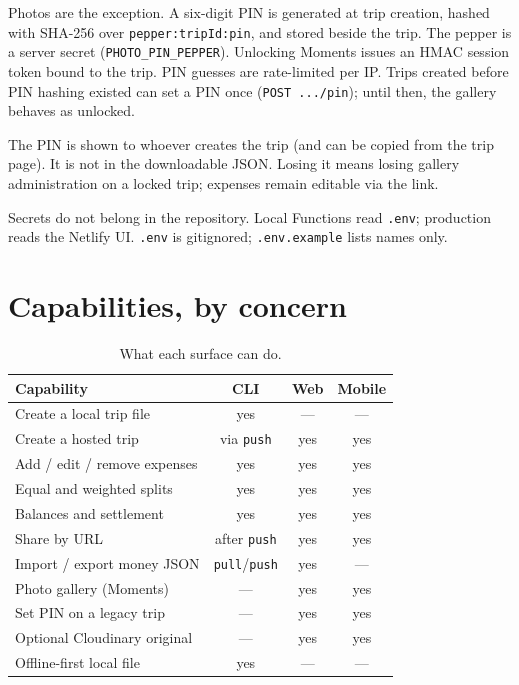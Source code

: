 \documentclass[11pt,a4paper]{article}
\newcommand{\code}[1]{\texttt{#1}}
\begin{document}
Photos are the exception.
A six-digit PIN is generated at trip creation, hashed with SHA-256 over \code{pepper:tripId:pin}, and stored beside the trip.
The pepper is a server secret (\code{PHOTO\_PIN\_PEPPER}).
Unlocking Moments issues an HMAC session token bound to the trip.
PIN guesses are rate-limited per IP.
Trips created before PIN hashing existed can set a PIN once (\code{POST .../pin}); until then, the gallery behaves as unlocked.

The PIN is shown to whoever creates the trip (and can be copied from the trip page).
It is not in the downloadable JSON.
Losing it means losing gallery administration on a locked trip; expenses remain editable via the link.

Secrets do not belong in the repository.
Local Functions read \code{.env}; production reads the Netlify UI.
\code{.env} is gitignored; \code{.env.example} lists names only.

\section{Capabilities, by concern}

\begin{table}[ht]
\centering
\caption{What each surface can do.}
\label{tab:caps}
\begin{tabular}{@{}lccc@{}}
\toprule
Capability & CLI & Web & Mobile \\
\midrule
Create a local trip file & yes & --- & --- \\
Create a hosted trip & via \code{push} & yes & yes \\
Add / edit / remove expenses & yes & yes & yes \\
Equal and weighted splits & yes & yes & yes \\
Balances and settlement & yes & yes & yes \\
Share by URL & after \code{push} & yes & yes \\
Import / export money JSON & \code{pull}/\code{push} & yes & --- \\
Photo gallery (Moments) & --- & yes & yes \\
Set PIN on a legacy trip & --- & yes & yes \\
Optional Cloudinary original & --- & yes & yes \\
Offline-first local file & yes & --- & --- \\
\bottomrule
\end{tabular}
\end{table}
\end{document}
